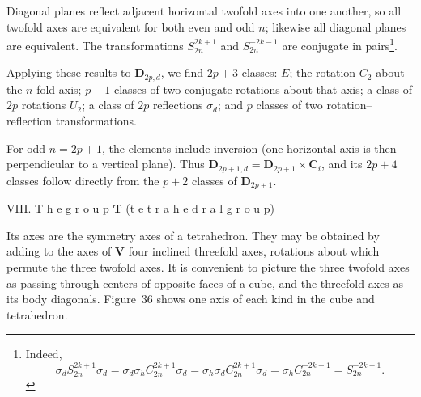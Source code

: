 Diagonal planes reflect adjacent horizontal twofold axes into one another, so all twofold axes are equivalent for both even and odd $n$; likewise all diagonal planes are equivalent. The transformations $S_{2n}^{2k+1}$ and $S_{2n}^{-2k-1}$ are conjugate in pairs\footnote{Indeed,
\[
\sigma_dS_{2n}^{2k+1}\sigma_d=\sigma_d\sigma_hC_{2n}^{2k+1}\sigma_d=\sigma_h\sigma_dC_{2n}^{2k+1}\sigma_d=\sigma_hC_{2n}^{-2k-1}=S_{2n}^{-2k-1}.
\]}.

Applying these results to $\boldsymbol{D}_{2p,d}$, we find $2p+3$ classes: $E$; the rotation $C_2$ about the $n$-fold axis; $p-1$ classes of two conjugate rotations about that axis; a class of $2p$ rotations $U_2$; a class of $2p$ reflections $\sigma_d$; and $p$ classes of two rotation--reflection transformations.

For odd $n=2p+1$, the elements include inversion (one horizontal axis is then perpendicular to a vertical plane). Thus $\boldsymbol{D}_{2p+1,d}=\boldsymbol{D}_{2p+1}\times\boldsymbol{C}_i$, and its $2p+4$ classes follow directly from the $p+2$ classes of $\boldsymbol{D}_{2p+1}$.

\medskip
\noindent VIII. T h e  g r o u p $\boldsymbol{T}$ (t e t r a h e d r a l  g r o u p)

Its axes are the symmetry axes of a tetrahedron. They may be obtained by adding to the axes of $\boldsymbol{V}$ four inclined threefold axes, rotations about which permute the three twofold axes. It is convenient to picture the three twofold axes as passing through centers of opposite faces of a cube, and the threefold axes as its body diagonals. Figure~36 shows one axis of each kind in the cube and tetrahedron.

\begin{figure}[ht]
\centering
{}
\caption{}
\label{fig:93-36}
\end{figure}

